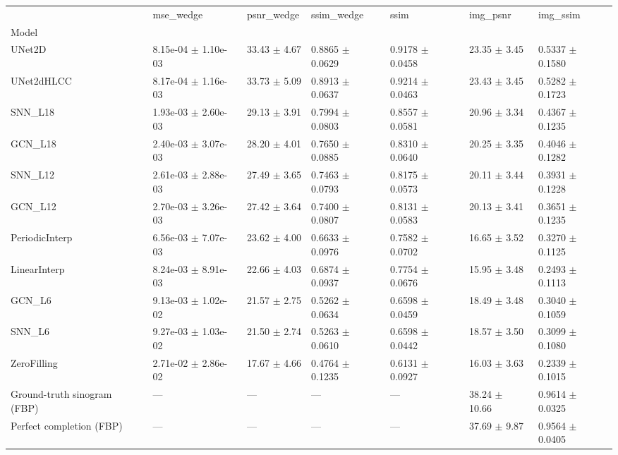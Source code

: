 \begin{tabular}{lllllll}
\toprule
 & mse\_wedge & psnr\_wedge & ssim\_wedge & ssim & img\_psnr & img\_ssim \\
Model &  &  &  &  &  &  \\
\midrule
UNet2D & 8.15e-04 $\pm$ 1.10e-03 & 33.43 $\pm$ 4.67 & 0.8865 $\pm$ 0.0629 & 0.9178 $\pm$ 0.0458 & 23.35 $\pm$ 3.45 & 0.5337 $\pm$ 0.1580 \\
UNet2dHLCC & 8.17e-04 $\pm$ 1.16e-03 & 33.73 $\pm$ 5.09 & 0.8913 $\pm$ 0.0637 & 0.9214 $\pm$ 0.0463 & 23.43 $\pm$ 3.45 & 0.5282 $\pm$ 0.1723 \\
SNN\_L18 & 1.93e-03 $\pm$ 2.60e-03 & 29.13 $\pm$ 3.91 & 0.7994 $\pm$ 0.0803 & 0.8557 $\pm$ 0.0581 & 20.96 $\pm$ 3.34 & 0.4367 $\pm$ 0.1235 \\
GCN\_L18 & 2.40e-03 $\pm$ 3.07e-03 & 28.20 $\pm$ 4.01 & 0.7650 $\pm$ 0.0885 & 0.8310 $\pm$ 0.0640 & 20.25 $\pm$ 3.35 & 0.4046 $\pm$ 0.1282 \\
SNN\_L12 & 2.61e-03 $\pm$ 2.88e-03 & 27.49 $\pm$ 3.65 & 0.7463 $\pm$ 0.0793 & 0.8175 $\pm$ 0.0573 & 20.11 $\pm$ 3.44 & 0.3931 $\pm$ 0.1228 \\
GCN\_L12 & 2.70e-03 $\pm$ 3.26e-03 & 27.42 $\pm$ 3.64 & 0.7400 $\pm$ 0.0807 & 0.8131 $\pm$ 0.0583 & 20.13 $\pm$ 3.41 & 0.3651 $\pm$ 0.1235 \\
PeriodicInterp & 6.56e-03 $\pm$ 7.07e-03 & 23.62 $\pm$ 4.00 & 0.6633 $\pm$ 0.0976 & 0.7582 $\pm$ 0.0702 & 16.65 $\pm$ 3.52 & 0.3270 $\pm$ 0.1125 \\
LinearInterp & 8.24e-03 $\pm$ 8.91e-03 & 22.66 $\pm$ 4.03 & 0.6874 $\pm$ 0.0937 & 0.7754 $\pm$ 0.0676 & 15.95 $\pm$ 3.48 & 0.2493 $\pm$ 0.1113 \\
GCN\_L6 & 9.13e-03 $\pm$ 1.02e-02 & 21.57 $\pm$ 2.75 & 0.5262 $\pm$ 0.0634 & 0.6598 $\pm$ 0.0459 & 18.49 $\pm$ 3.48 & 0.3040 $\pm$ 0.1059 \\
SNN\_L6 & 9.27e-03 $\pm$ 1.03e-02 & 21.50 $\pm$ 2.74 & 0.5263 $\pm$ 0.0610 & 0.6598 $\pm$ 0.0442 & 18.57 $\pm$ 3.50 & 0.3099 $\pm$ 0.1080 \\
ZeroFilling & 2.71e-02 $\pm$ 2.86e-02 & 17.67 $\pm$ 4.66 & 0.4764 $\pm$ 0.1235 & 0.6131 $\pm$ 0.0927 & 16.03 $\pm$ 3.63 & 0.2339 $\pm$ 0.1015 \\
Ground-truth sinogram (FBP) & — & — & — & — & 38.24 $\pm$ 10.66 & 0.9614 $\pm$ 0.0325 \\
Perfect completion (FBP) & — & — & — & — & 37.69 $\pm$ 9.87 & 0.9564 $\pm$ 0.0405 \\
\bottomrule
\end{tabular}
